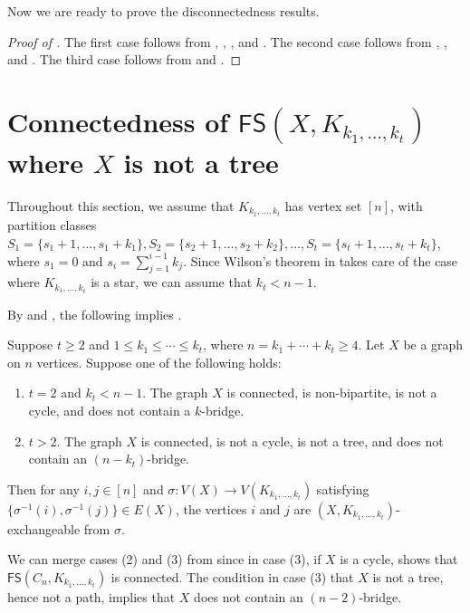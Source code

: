 \documentclass{mystyle}
\newcommand{\FS}{\mathsf{FS}}
\begin{document}
Now we are ready to prove the disconnectedness results.
\begin{proof}[Proof of ]
    The first case follows from , , , and . The second case follows from , , and . The third case follows from  and .
\end{proof}

\section{Connectedness of $\FS(X, K_{k_1, \ldots, k_t})$ where $X$ is not a tree}\label{sec_not_tree}
Throughout this section, we assume that $K_{k_1, \ldots, k_t}$ has vertex set $[n]$, with partition classes $S_1 = \{s_1 + 1, \ldots, s_1 + k_1\}, S_2 = \{s_2 + 1, \ldots, s_2 + k_2\}, \ldots, S_t = \{s_{t} + 1, \ldots, s_{t} + k_t\}$, where $s_1 = 0$ and $s_i = \sum_{j = 1}^{i - 1} k_j$. Since Wilson's theorem in \cite{wilson1974} takes care of the case where $K_{k_1, \ldots, k_t}$ is a star, we can assume that $k_t < n - 1$. 

By  and , the following implies . 

\begin{theorem}\label{thm_reduction}
    Suppose $t \geq 2$ and $1 \leq k_1 \leq \cdots \leq k_t$, where $n = k_1 + \cdots + k_t \geq 4$. Let $X$ be a graph on $n$ vertices. Suppose one of the following holds:
    \begin{enumerate}
        \item $t = 2$ and $k_t < n - 1$. The graph $X$ is connected, is non-bipartite, is not a cycle, and does not contain a $k$-bridge.
        \item $t > 2$. The graph $X$ is connected, is not a cycle, is not a tree, and does not contain an $(n - k_t)$-bridge.
    \end{enumerate} 
    Then for any $i, j \in [n]$ and $\sigma: V(X) \to V(K_{k_1, \ldots, k_t})$ satisfying $\{\sigma^{-1}(i), \sigma^{-1}(j)\} \in E(X)$, the vertices $i$ and $j$ are $(X, K_{k_1, \ldots, k_t})$-exchangeable from $\sigma$. 
\end{theorem}
We can merge cases (2) and (3) from  since in case (3), if $X$ is a cycle,  shows that $\FS(C_n, K_{k_1, \ldots, k_t})$ is connected. The condition in case (3) that $X$ is not a tree, hence not a path, implies that $X$ does not contain an $(n - 2)$-bridge.
\end{document}
